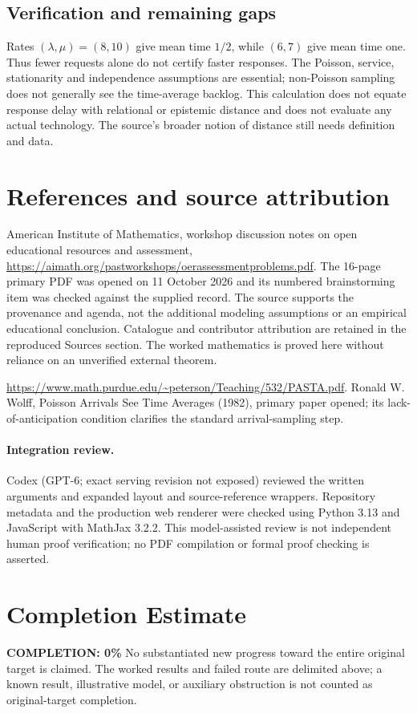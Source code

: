 \documentclass[11pt]{article}
\begin{document}
\subsection{Verification and remaining gaps}
Rates $(\lambda,\mu)=(8,10)$ give mean time $1/2$, while $(6,7)$ give mean time one. Thus fewer requests alone do not certify faster responses. The Poisson, service, stationarity and independence assumptions are essential; non-Poisson sampling does not generally see the time-average backlog. This calculation does not equate response delay with relational or epistemic distance and does not evaluate any actual technology. The source's broader notion of distance still needs definition and data.

\section{References and source attribution}
American Institute of Mathematics, workshop discussion notes on open educational resources and assessment, \url{https://aimath.org/pastworkshops/oerassessmentproblems.pdf}. The 16-page primary PDF was opened on 11 October 2026 and its numbered brainstorming item was checked against the supplied record. The source supports the provenance and agenda, not the additional modeling assumptions or an empirical educational conclusion. Catalogue and contributor attribution are retained in the reproduced Sources section. The worked mathematics is proved here without reliance on an unverified external theorem.

\url{https://www.math.purdue.edu/~peterson/Teaching/532/PASTA.pdf}. Ronald W. Wolff, Poisson Arrivals See Time Averages (1982), primary paper opened; its lack-of-anticipation condition clarifies the standard arrival-sampling step.


\paragraph{Integration review.} Codex (GPT-6; exact serving revision not exposed) reviewed the written arguments and expanded layout and source-reference wrappers. Repository metadata and the production web renderer were checked using Python 3.13 and JavaScript with MathJax 3.2.2. This model-assisted review is not independent human proof verification; no PDF compilation or formal proof checking is asserted.

\section{Completion Estimate}
\noindent\textbf{COMPLETION: 0\%}
No substantiated new progress toward the entire original target is claimed. The worked results and failed route are delimited above; a known result, illustrative model, or auxiliary obstruction is not counted as original-target completion.
\end{document}
